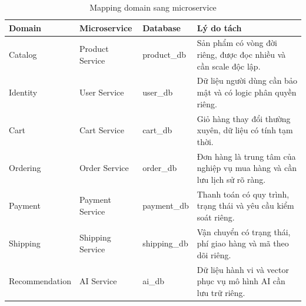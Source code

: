 \documentclass[../main.tex]{subfiles}
\begin{document}
\begin{table}[H]
    \centering
    \caption{Mapping domain sang microservice}
    \label{tab:chapter2-domain-service-mapping}
    \begin{tabular}{|p{}|p{}|p{}|p{}|}
        \hline
        \rowcolor{primary!35}
        \textbf{Domain} & \textbf{Microservice} & \textbf{Database} & \textbf{Lý do tách} \\
        \hline
        Catalog & Product Service & product\_db & Sản phẩm có vòng đời riêng, được đọc nhiều và cần scale độc lập. \\
        \hline
        Identity & User Service & user\_db & Dữ liệu người dùng cần bảo mật và có logic phân quyền riêng. \\
        \hline
        Cart & Cart Service & cart\_db & Giỏ hàng thay đổi thường xuyên, dữ liệu có tính tạm thời. \\
        \hline
        Ordering & Order Service & order\_db & Đơn hàng là trung tâm của nghiệp vụ mua hàng và cần lưu lịch sử rõ ràng. \\
        \hline
        Payment & Payment Service & payment\_db & Thanh toán có quy trình, trạng thái và yêu cầu kiểm soát riêng. \\
        \hline
        Shipping & Shipping Service & shipping\_db & Vận chuyển có trạng thái, phí giao hàng và mã theo dõi riêng. \\
        \hline
        Recommendation & AI Service & ai\_db & Dữ liệu hành vi và vector phục vụ mô hình AI cần lưu trữ riêng. \\
        \hline
    \end{tabular}
\end{table}
\end{document}
